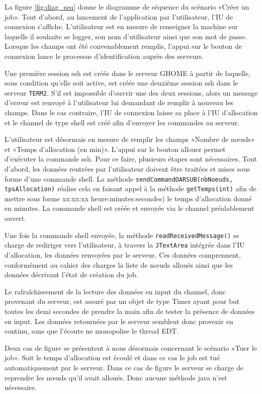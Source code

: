 \par La figure \ref{fig:diag_seq} donne le diagramme de séquence du scénario «Créer un job».  Tout d’abord, au lancement de l’application par l’utilisateur, l’IU de connexion s’affiche. L’utilisateur est en mesure de renseigner la machine sur laquelle il souhaite se logger, son nom d’utilisateur ainsi que son mot de passe. Lorsque les champs ont été convenablement remplis, l’appui sur le bouton de connexion lance le processus d’identification auprès des serveurs.
\par Une première session ssh est créée dans le serveur GHOME à partir de laquelle, sous condition qu’elle soit active, est créée une deuxième session ssh dans le serveur \texttt{TERM2}. S’il est impossible d’ouvrir une des deux sessions, alors un message d’erreur est renvoyé à l’utilisateur lui demandant de remplir à nouveau les champs. Dans le cas contraire, l’IU de connexion laisse sa place à l’IU d’allocation et le channel de type shell est créé afin d’envoyer les commandes au serveur.
\par L’utilisateur est désormais en mesure de remplir les champs «Nombre de nœuds» et «Temps d’allocation (en min)». L’appui sur le bouton allouer permet d’exécuter la commande ssh. Pour ce faire, plusieurs étapes sont nécessaires. Tout d’abord, les données rentrées par l’utilisateur doivent être traitées et mises sous forme d’une commande shell. La méthode \texttt{sendCommandOARSUB(nbNoeuds, tpsAllocation)} réalise cela en faisant appel à la méthode \texttt{getTemps(int)} afin de mettre sous forme xx:xx:xx heure:minutes:secondes) le temps d’allocation donné en minutes. La commande shell est créée et envoyée via le channel préalablement ouvert.
\par Une fois la commande shell envoyée, la méthode \texttt{readReceivedMessage()} se charge de rediriger vers l’utilisateur, à travers la \texttt{JTextArea} intégrée dans l’IU d’allocation, les données  renvoyées par le serveur. Ces données comprennent, conformément au cahier des charges la liste de nœuds alloués ainsi que les données décrivant l’état de création du job. 
\par Le rafraîchissement de la lecture des données en input du channel, donc provenant du serveur, est assuré par un objet de type Timer ayant pour but toutes les demi secondes de prendre la main afin de tester la présence de données en input. Les données retournées par le serveur semblent donc provenir en continu, sans que l'écoute ne monopolise le thread EDT.
\par Deux cas de figure se présentent à nous désormais concernant le scénario «Tuer le job». Soit le temps d’allocation est écoulé et dans ce cas le job est tué automatiquement par le serveur. Dans ce cas de figure le serveur se charge de reprendre les nœuds qu’il avait alloués. Donc aucune méthode java n’est nécessaire. 
